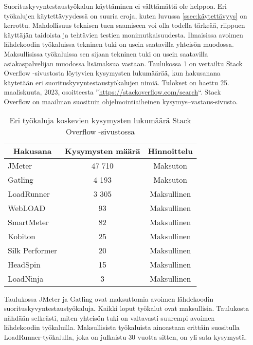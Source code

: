 Suorituskyvyntestaustyökalun käyttäminen ei välttämättä ole helppoa. Eri työkalujen käytettävyydessä on suuria eroja, kuten luvussa \ref{ssec:käytettävyys} on kerrottu. Mahdollisuus teknisen tuen saamiseen voi olla todella tärkeää, riippuen käyttäjän taidoista ja tehtävien testien monimutkaisuudesta. Ilmaisissa avoimen lähdekoodin työkaluissa tekninen tuki on usein saatavilla yhteisön muodossa. Maksullisissa työkaluissa sen sijaan tekninen tuki on usein saatavilla asiakaspalvelijan muodossa lisämaksua vastaan. Taulukossa \ref{tab:stackoverflow} on vertailtu Stack Overflow -sivustosta löytyvien kysymysten lukumäärää, kun hakusanana käytetään eri suorituskyvyntestaustyökalujen nimiä. Tulokset on haettu 25. maaliskuuta, 2023, osoitteesta ''\url{https://stackoverflow.com/search}``. Stack Overflow on maailman suosituin ohjelmointiaiheinen kysymys--vastaus-sivusto.  

\begin{longtable}{|l|c|c|}
\caption{Eri työkaluja koskevien kysymysten lukumäärä Stack Overflow -sivustossa}
\label{tab:stackoverflow}\\
\hline
\multicolumn{1}{|c|}{\textbf{Hakusana}} & 
\multicolumn{1}{|c|}{\textbf{Kysymysten määrä}} & 
\multicolumn{1}{c|}{\textbf{Hinnoittelu}} \\ \hline
\endfirsthead
%
\endhead
%
JMeter             & 47 710   & Maksuton     \\ \hline
Gatling            & 4 193    & Maksuton     \\ \hline
LoadRunner         & 3 305    & Maksullinen  \\ \hline
WebLOAD            & 93       & Maksullinen  \\ \hline
SmartMeter         & 82       & Maksullinen  \\ \hline
Kobiton            & 25       & Maksullinen  \\ \hline
Silk Performer     & 20       & Maksullinen  \\ \hline
HeadSpin           & 15       & Maksullinen  \\ \hline
LoadNinja          & 3        & Maksullinen  \\ \hline
\end{longtable}

Taulukossa JMeter ja Gatling ovat maksuttomia avoimen lähdekoodin suorituskyvyntestaustyökaluja. Kaikki loput työkalut ovat maksullisia. Taulukosta nähdään selkeästi, miten yhteisön tuki on valtavasti suurempi avoimen lähdekoodin työkaluilla. Maksullisista työkaluista ainoastaan erittäin suositulla LoadRunner-työkalulla, joka on julkaistu 30 vuotta sitten, on yli sata kysymystä.

